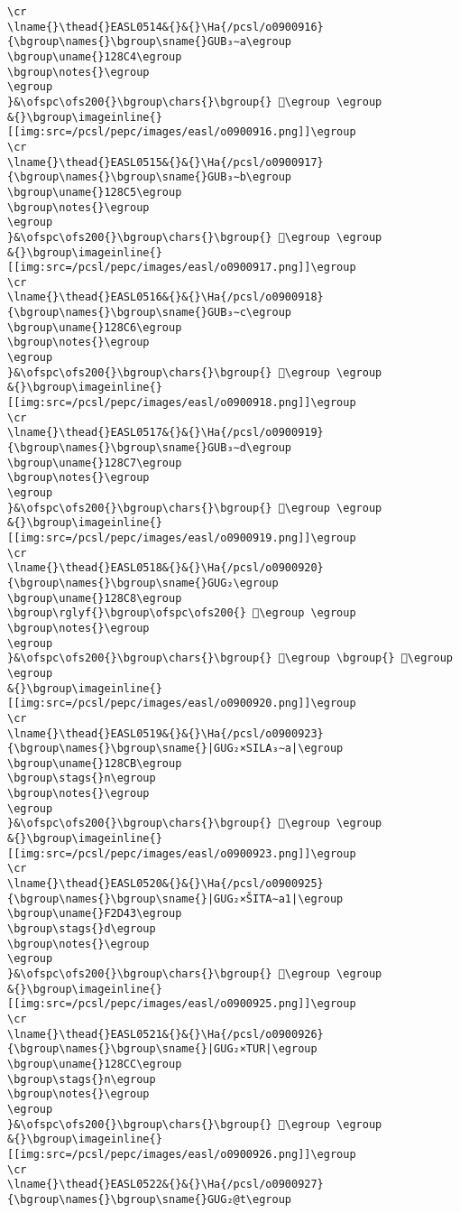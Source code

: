 \begin{verbatim}
\cr
\lname{}\thead{}EASL0514&{}&{}\Ha{/pcsl/o0900916}{\bgroup\names{}\bgroup\sname{}GUB₃∼a\egroup
\bgroup\uname{}128C4\egroup
\bgroup\notes{}\egroup
\egroup
}&\ofspc\ofs200{}\bgroup\chars{}\bgroup{} 𒣄\egroup \egroup
&{}\bgroup\imageinline{}[[img:src=/pcsl/pepc/images/easl/o0900916.png]]\egroup
\cr
\lname{}\thead{}EASL0515&{}&{}\Ha{/pcsl/o0900917}{\bgroup\names{}\bgroup\sname{}GUB₃∼b\egroup
\bgroup\uname{}128C5\egroup
\bgroup\notes{}\egroup
\egroup
}&\ofspc\ofs200{}\bgroup\chars{}\bgroup{} 𒣅\egroup \egroup
&{}\bgroup\imageinline{}[[img:src=/pcsl/pepc/images/easl/o0900917.png]]\egroup
\cr
\lname{}\thead{}EASL0516&{}&{}\Ha{/pcsl/o0900918}{\bgroup\names{}\bgroup\sname{}GUB₃∼c\egroup
\bgroup\uname{}128C6\egroup
\bgroup\notes{}\egroup
\egroup
}&\ofspc\ofs200{}\bgroup\chars{}\bgroup{} 𒣆\egroup \egroup
&{}\bgroup\imageinline{}[[img:src=/pcsl/pepc/images/easl/o0900918.png]]\egroup
\cr
\lname{}\thead{}EASL0517&{}&{}\Ha{/pcsl/o0900919}{\bgroup\names{}\bgroup\sname{}GUB₃∼d\egroup
\bgroup\uname{}128C7\egroup
\bgroup\notes{}\egroup
\egroup
}&\ofspc\ofs200{}\bgroup\chars{}\bgroup{} 𒣇\egroup \egroup
&{}\bgroup\imageinline{}[[img:src=/pcsl/pepc/images/easl/o0900919.png]]\egroup
\cr
\lname{}\thead{}EASL0518&{}&{}\Ha{/pcsl/o0900920}{\bgroup\names{}\bgroup\sname{}GUG₂\egroup
\bgroup\uname{}128C8\egroup
\bgroup\rglyf{}\bgroup\ofspc\ofs200{} 𒣈\egroup \egroup
\bgroup\notes{}\egroup
\egroup
}&\ofspc\ofs200{}\bgroup\chars{}\bgroup{} 𒣊\egroup \bgroup{} 𒣈\egroup \egroup
&{}\bgroup\imageinline{}[[img:src=/pcsl/pepc/images/easl/o0900920.png]]\egroup
\cr
\lname{}\thead{}EASL0519&{}&{}\Ha{/pcsl/o0900923}{\bgroup\names{}\bgroup\sname{}|GUG₂×SILA₃∼a|\egroup
\bgroup\uname{}128CB\egroup
\bgroup\stags{}n\egroup
\bgroup\notes{}\egroup
\egroup
}&\ofspc\ofs200{}\bgroup\chars{}\bgroup{} 𒣋\egroup \egroup
&{}\bgroup\imageinline{}[[img:src=/pcsl/pepc/images/easl/o0900923.png]]\egroup
\cr
\lname{}\thead{}EASL0520&{}&{}\Ha{/pcsl/o0900925}{\bgroup\names{}\bgroup\sname{}|GUG₂×ŠITA∼a1|\egroup
\bgroup\uname{}F2D43\egroup
\bgroup\stags{}d\egroup
\bgroup\notes{}\egroup
\egroup
}&\ofspc\ofs200{}\bgroup\chars{}\bgroup{} 󲵃\egroup \egroup
&{}\bgroup\imageinline{}[[img:src=/pcsl/pepc/images/easl/o0900925.png]]\egroup
\cr
\lname{}\thead{}EASL0521&{}&{}\Ha{/pcsl/o0900926}{\bgroup\names{}\bgroup\sname{}|GUG₂×TUR|\egroup
\bgroup\uname{}128CC\egroup
\bgroup\stags{}n\egroup
\bgroup\notes{}\egroup
\egroup
}&\ofspc\ofs200{}\bgroup\chars{}\bgroup{} 𒣌\egroup \egroup
&{}\bgroup\imageinline{}[[img:src=/pcsl/pepc/images/easl/o0900926.png]]\egroup
\cr
\lname{}\thead{}EASL0522&{}&{}\Ha{/pcsl/o0900927}{\bgroup\names{}\bgroup\sname{}GUG₂@t\egroup

\end{verbatim}
